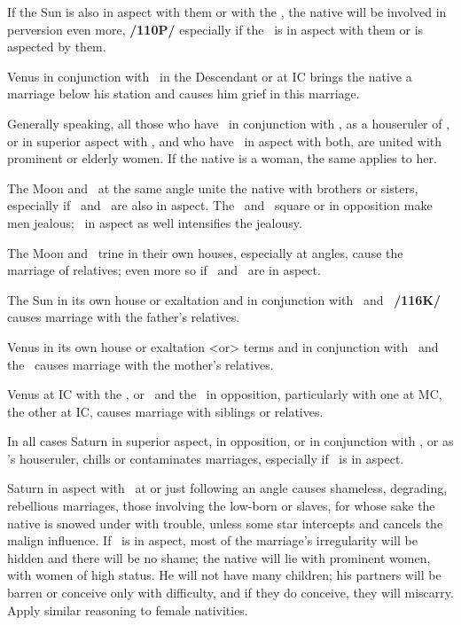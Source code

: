 If the Sun is also in aspect with them or with the \Moon, the native will be involved in perversion even more, \textbf{/110P/} especially if the \Moon\, is in aspect with them or is aspected by them. 

Venus in conjunction with \Saturn\, in the
Descendant or at IC brings the native a marriage below his station and causes him grief in this marriage. 

Generally speaking, all those who have \Venus\, in conjunction with \Saturn, as a houseruler of \Saturn, or in superior aspect with \Saturn, and who have \Jupiter\, in aspect with both, are united with prominent or elderly women. If the native is a woman, the same applies to her.

The Moon and \Venus\, at the same angle unite the native with brothers or sisters, especially if \Jupiter\,
and \Mars\, are also in aspect. The \Moon\, and \Venus\, square or in opposition make men jealous; \Mars\, in aspect as well intensifies the jealousy. 

The Moon and \Venus\, trine in their own houses, especially at angles, cause the marriage of relatives; even more so if \Mars\, and \Jupiter\, are in aspect. 

The Sun in its own house or exaltation and in conjunction with \Jupiter\, and \Venus\, \textbf{/116K/} causes marriage with the father’s relatives. 

Venus in its own house or exaltation <or> terms and in conjunction with \Mercury\, and the \Moon\,
causes marriage with the mother’s relatives. 

Venus at IC with the \Moon, or \Venus\, and the \Moon\, in opposition, particularly with one at MC, the other at IC, causes marriage with siblings or relatives.

In all cases Saturn in superior aspect, in opposition, or in conjunction with \Venus, or as \Venus’s houseruler, chills or contaminates marriages, especially if \Mercury\, is in aspect. 

Saturn in aspect with \Venus\, at or just following an angle causes shameless, degrading, rebellious marriages, those involving the low-born or slaves, for whose sake the native is snowed under with trouble, unless some star intercepts and cancels the malign influence. If \Jupiter\, is in aspect, most of the marriage’s irregularity will be hidden and there will be no shame; the native will lie with prominent women, with women of high status. He will not have many children; his partners will be barren or conceive only with difficulty, and if they do conceive, they will miscarry. Apply similar reasoning to female nativities.

